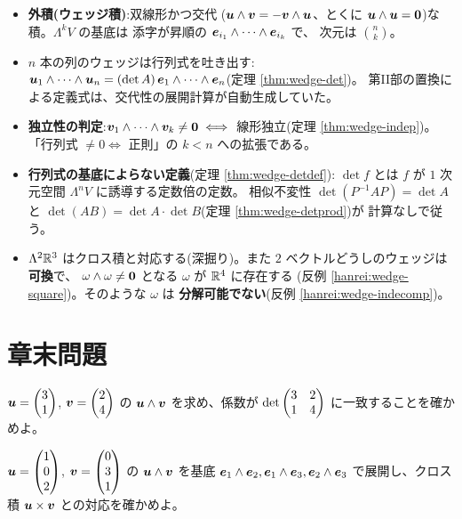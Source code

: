 \begin{matome}
\begin{itemize}
\item \textbf{外積(ウェッジ積)}:双線形かつ交代
($\bm{u} \wedge \bm{v} = -\bm{v} \wedge \bm{u}$、とくに
$\bm{u} \wedge \bm{u} = \bm{0}$)な積。$\Lambda^k V$ の基底は
添字が昇順の $\bm{e}_{i_1} \wedge \cdots \wedge \bm{e}_{i_k}$ で、
次元は $\binom{n}{k}$。
\item $n$ 本の列のウェッジは行列式を吐き出す:
$\bm{u}_1 \wedge \cdots \wedge \bm{u}_n = (\det A)\,
\bm{e}_1 \wedge \cdots \wedge \bm{e}_n$(定理 \ref{thm:wedge-det})。
第II部の置換による定義式は、交代性の展開計算が自動生成していた。
\item \textbf{独立性の判定}:$\bm{v}_1 \wedge \cdots \wedge \bm{v}_k
\neq \bm{0} \iff$ 線形独立(定理 \ref{thm:wedge-indep})。
「行列式 $\neq 0 \iff$ 正則」の $k < n$ への拡張である。
\item \textbf{行列式の基底によらない定義}(定理 \ref{thm:wedge-detdef}):
$\det f$ とは $f$ が $1$ 次元空間 $\Lambda^n V$ に誘導する定数倍の定数。
相似不変性 $\det(P^{-1}AP) = \det A$ と
$\det(AB) = \det A \cdot \det B$(定理 \ref{thm:wedge-detprod})が
計算なしで従う。
\item $\Lambda^2 \mathbb{R}^3$ はクロス積と対応する(深掘り)。また
$2$ ベクトルどうしのウェッジは\textbf{可換}で、
$\omega \wedge \omega \neq \bm{0}$ となる $\omega$ が $\mathbb{R}^4$ に存在する
(反例 \ref{hanrei:wedge-square})。そのような $\omega$ は
\textbf{分解可能でない}(反例 \ref{hanrei:wedge-indecomp})。
\end{itemize}
\end{matome}

\section*{章末問題}

\begin{mondai}[基本]\label{q:wedge-ex1}
$\bm{u} = \begin{pmatrix}3 \\ 1\end{pmatrix}$, $\bm{v} = \begin{pmatrix}2 \\ 4\end{pmatrix}$ の
$\bm{u} \wedge \bm{v}$ を求め、係数が
$\det\begin{pmatrix}3 & 2 \\ 1 & 4\end{pmatrix}$ に一致することを確かめよ。
\end{mondai}

\begin{mondai}[基本]\label{q:wedge-ex2}
$\bm{u} = \begin{pmatrix}1 \\ 0 \\ 2\end{pmatrix}$, $\bm{v} = \begin{pmatrix}0 \\ 3 \\ 1\end{pmatrix}$ の
$\bm{u} \wedge \bm{v}$ を基底
$\bm{e}_1 \wedge \bm{e}_2, \bm{e}_1 \wedge \bm{e}_3,
\bm{e}_2 \wedge \bm{e}_3$ で展開し、クロス積
$\bm{u} \times \bm{v}$ との対応を確かめよ。
\end{mondai}

